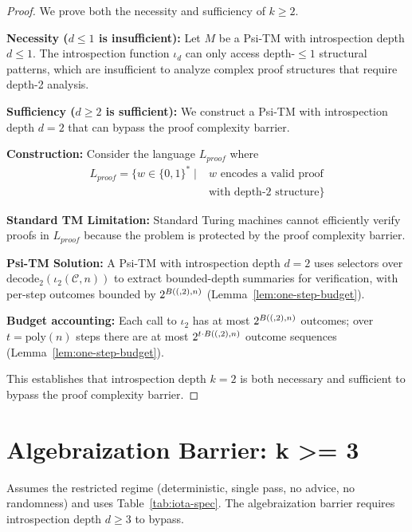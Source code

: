 \begin{proof}
We prove both the necessity and sufficiency of $k \geq 2$.

\textbf{Necessity ($d \le 1$ is insufficient):}
Let $M$ be a Psi-TM with introspection depth $d \leq 1$. The introspection function $\iota_d$ can only access depth-$\leq 1$ structural patterns, which are insufficient to analyze complex proof structures that require depth-2 analysis.

\textbf{Sufficiency ($d \ge 2$ is sufficient):}
We construct a Psi-TM with introspection depth $d = 2$ that can bypass the proof complexity barrier.

\textbf{Construction:}
Consider the language $L_{proof}$ where
\begin{align}
L_{proof} = \{w \in \{0,1\}^* \mid &\text{$w$ encodes a valid proof} \nonumber \\
&\text{with depth-2 structure}\}
\end{align}

\textbf{Standard TM Limitation:}
Standard Turing machines cannot efficiently verify proofs in $L_{proof}$ because the problem is protected by the proof complexity barrier.

\textbf{Psi-TM Solution:}
A Psi-TM with introspection depth $d = 2$ uses selectors over $\mathrm{decode}_2(\iota_2(\mathcal{C},n))$ to extract bounded-depth summaries for verification, with per-step outcomes bounded by $2^{B((,2),n)}$ (Lemma~\ref{lem:one-step-budget}).

\textbf{Budget accounting:}
Each call to $\iota_2$ has at most $2^{B((,2),n)}$ outcomes; over $t=\mathrm{poly}(n)$ steps there are at most $2^{t\cdot B((,2),n)}$ outcome sequences (Lemma~\ref{lem:one-step-budget}).

This establishes that introspection depth $k = 2$ is both necessary and sufficient to bypass the proof complexity barrier.
\end{proof}

\section{Algebraization Barrier: k >= 3}

\begin{theorem}
Assumes the restricted regime (deterministic, single pass, no advice, no randomness) and uses Table~\ref{tab:iota-spec}.
The algebraization barrier requires introspection depth $d \geq 3$ to bypass.
\end{theorem}


